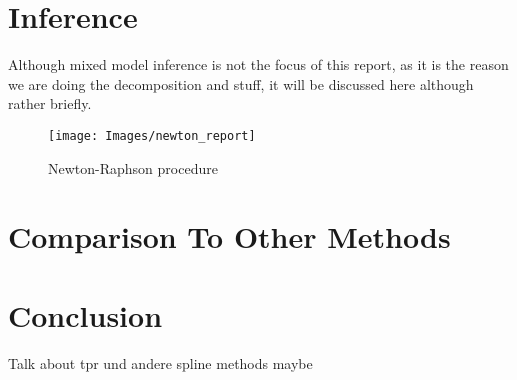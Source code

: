 \documentclass[12pt]{article}
\begin{document}
\section{Inference}
Although mixed model inference is not the focus of this report, as it is the reason we are doing the decomposition and stuff, it will be discussed here although rather briefly.



\begin{figure}
\begin{center}
\texttt{[image: Images/newton\_report]}
\end{center}
\vspace{-2em}
\caption[caption]{Newton-Raphson procedure}\label{newton}
\end{figure}


\section{Comparison To Other Methods}

\section{Conclusion}
Talk about tpr und andere spline methods maybe




\newpage
\printbibliography
\end{document}

